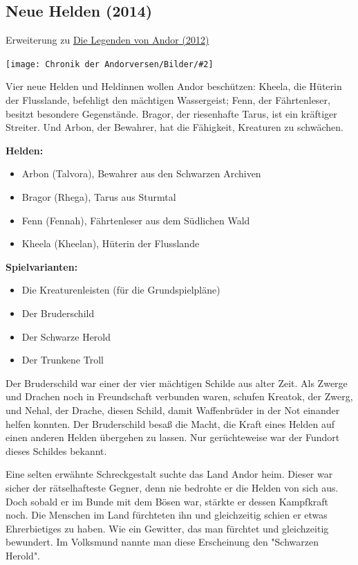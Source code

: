 \documentclass[10pt, a4paper, oneside]{book}
\newcommand{\fillbreak}{\vspace*{\fill}\columnbreak}
\newcommand{\produkt}[1]{%
    \section{#1}%
    \label{Produkt: #1}%
}
\newcommand{\refprodukt}[1]{\hyperref[Produkt: #1]{#1}}
\newcommand{\bildmitts}[2][height=0.32\textwidth,width=0.48\textwidth,keepaspectratio]{%
    \begin{center}
        \texttt{[image: Chronik der Andorversen/Bilder/\#2]}
    \end{center}
}
\begin{document}
\begin{multicols}{2}
\fillbreak
\produkt{Neue Helden (2014)}

\begin{center}
    Erweiterung zu \refprodukt{Die Legenden von Andor (2012)}
\end{center}

\bildmitts{Neue Helden (2014).png}

Vier neue Helden und Heldinnen wollen Andor beschützen: Kheela, die Hüterin der Flusslande, befehligt den mächtigen Wassergeist; Fenn, der Fährtenleser, besitzt besondere Gegenstände. Bragor, der riesenhafte Tarus, ist ein kräftiger Streiter. Und Arbon, der Bewahrer, hat die Fähigkeit, Kreaturen zu schwächen.\bigskip

\textbf{Helden:}

\begin{itemize}[topsep=0pt,itemsep=-1ex,partopsep=1ex,parsep=1ex]
    \item Arbon (Talvora), Bewahrer aus den Schwarzen Archiven
    \item Bragor (Rhega), Tarus aus Sturmtal
    \item Fenn (Fennah), Fährtenleser aus dem Südlichen Wald
    \item Kheela (Kheelan), Hüterin der Flusslande
\end{itemize}



\textbf{Spielvarianten:} 

\begin{itemize}[topsep=0pt,itemsep=-1ex,partopsep=1ex,parsep=1ex]
    \item Die Kreaturenleisten (für die Grundspielpläne)
    \item Der Bruderschild
    \item Der Schwarze Herold
    \item Der Trunkene Troll
\end{itemize}

Der Bruderschild war einer der vier mächtigen Schilde aus alter Zeit. Als Zwerge und Drachen noch in Freundschaft verbunden waren, schufen Kreatok, der Zwerg, und Nehal, der Drache, diesen Schild, damit Waffenbrüder in der Not einander helfen konnten. Der Bruderschild besaß die Macht, die Kraft eines Helden auf einen anderen Helden übergehen zu lassen. Nur gerüchteweise war der Fundort dieses Schildes bekannt. \bigskip

Eine selten erwähnte Schreckgestalt suchte das Land Andor heim. Dieser war sicher der rätselhafteste Gegner, denn nie bedrohte er die Helden von sich aus. Doch sobald er im Bunde mit dem Bösen war, stärkte er dessen Kampfkraft noch. Die Menschen im Land fürchteten ihn und gleichzeitig schien er etwas Ehrerbietiges zu haben. Wie ein Gewitter, das man fürchtet und gleichzeitig bewundert. Im Volksmund nannte man diese Erscheinung den "Schwarzen Herold".\bigskip


\end{multicols}
\end{document}
